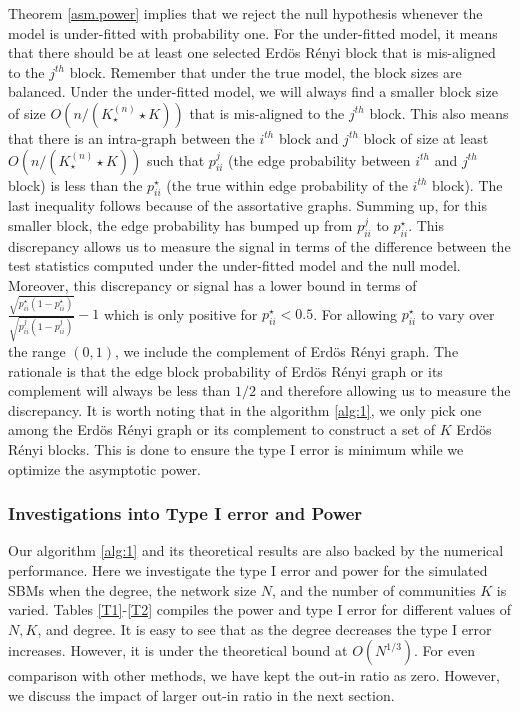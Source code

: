 \documentclass[11pt]{article}
\begin{document}
Theorem \ref{asm.power} implies that we reject the null hypothesis whenever the model is under-fitted with probability one. For the under-fitted model, it means that there should be at least one selected Erd\"{o}s R\'{e}nyi block that is mis-aligned to the $j^{th}$ block. Remember that under the true model, the block sizes are balanced. Under the under-fitted model, we will always find a smaller block size of size $O(n/(K_{\star}^{(n)}\star K))$ that is mis-aligned to the $j^{th}$ block. This also means that there is an intra-graph between the $i^{th}$ block and $j^{th}$ block of size at least $O(n/(K_{\star}^{(n)}\star K))$ such that $p_{ii}^j$ (the edge probability between $i^{th}$ and $j^{th}$ block) is less than the $p^\star_{ii}$ (the true within edge probability of the $i^{th}$ block). The last inequality follows because of the assortative graphs. Summing up, for this smaller block, the edge probability has bumped up from $p^j_{ii}$ to $p^{\star}_{ii}$. This discrepancy allows us to measure the signal in terms of the difference between the test statistics computed under the under-fitted model and the null model. Moreover, this discrepancy or signal has a lower bound in terms of $\frac{\sqrt{p^\star_{ii} (1 - p^\star_{ii})}}{\sqrt{p_{ii}^j (1 - p_{ii}^j)}} - 1$ which is only positive for $p^\star_{ii} < 0.5$. For allowing $p^\star_{ii}$ to vary over the range $(0,1)$, we include the complement of Erd\"{o}s R\'{e}nyi graph. The rationale is that the edge block probability of Erd\"{o}s R\'{e}nyi graph or its complement will always be less than $1/2$ and therefore allowing us to measure the discrepancy. It is worth noting that in the algorithm \ref{alg:1}, we only pick one among the Erd\"{o}s R\'{e}nyi graph or its complement to construct a set of $K$ Erd\"{o}s R\'{e}nyi blocks. This is done to ensure the type I error is minimum while we optimize the asymptotic power.


\subsubsection{Investigations into Type I error and Power}
Our algorithm \ref{alg:1} and its theoretical results are also backed by the numerical performance. Here we investigate the type I error and power for the simulated SBMs when the degree, the network size $N$, and the number of communities $K$ is varied. Tables \ref{T1}-\ref{T2} compiles the power and type I error for different values of $N, K$, and degree. It is easy to see that as the degree decreases the type I error increases. However, it is under the theoretical bound at $O(N^{1/3})$. For even comparison with other methods, we have kept the out-in ratio as zero. However, we discuss the impact of larger out-in ratio in the next section.
\end{document}
